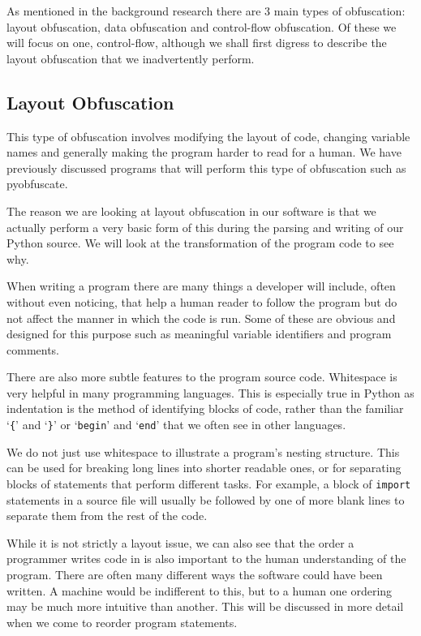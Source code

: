 \documentclass[twoside,a4paper]{report}
\begin{document}
As mentioned in the background research there are 3 main types of obfuscation: layout obfuscation, data
obfuscation and control-flow obfuscation. Of these we will focus on one, control-flow, although we shall
first digress to describe the layout obfuscation that we inadvertently perform.

\subsection{Layout Obfuscation}

This type of obfuscation involves modifying the layout of code, changing variable names and
generally making the program harder to read for a human. We have previously discussed programs that will
perform this type of obfuscation such as pyobfuscate.

The reason we are looking at layout obfuscation in our software is that we actually perform a very basic
form of this during the parsing and writing of our Python source. We will look at the transformation of the
program code to see why.

When writing a program there are many things a developer will include, often without even noticing, that
help a human reader to follow the program but do not affect the manner in which the code is run. Some of
these are obvious and designed for this purpose such as meaningful variable identifiers and program comments.

There are also more subtle features to the program source code. Whitespace is very helpful in many programming
languages. This is especially true in Python as indentation is the method of identifying blocks of code, rather than
the familiar `\texttt{\{}' and `\texttt{\}}' or `\texttt{begin}' and `\texttt{end}' that we often see in other
languages. 

We do not just use whitespace to illustrate a program's nesting structure. This can be used for breaking long lines
into shorter readable ones, or for separating blocks of statements that perform different tasks. For example, a block
of \texttt{import} statements in a source file will usually be followed by one of more blank lines to separate them
from the rest of the code.

While it is not strictly a layout issue, we can also see that the order a programmer writes code in is also important
to the human understanding of the program. There are often many different ways the software could have been written.
A machine would be indifferent to this, but to a human one ordering may be much more intuitive than another. This will be discussed
in more detail when we come to reorder program statements.
\end{document}
